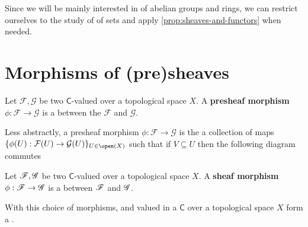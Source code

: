 \documentclass[../main.tex]{subfiles}
\begin{document}
Since we will be mainly interested in  of abelian groups and rings, we can restrict ourselves to the study of  of sets and apply \autoref{prop:sheaves-and-functors} when needed.



\section{Morphisms of (pre)sheaves}

\begin{definition} \label{def:presheaf-morphism}
  Let \(\mathcal{F}, \mathcal{G}\) be two \(\mathsf{C}\)-valued  over a topological space \(X\).
  A \textbf{presheaf morphism} \(\phi: \mathcal{F} \to \mathcal{G}\) is a  between the  \(\mathcal{F}\) and \(\mathcal{G}\).

  Less abstractly, a presheaf morphism \(\phi: \mathcal{F} \to \mathcal{G}\) is the a collection of maps \(\{\phi(U): \mathcal{F}(U) \to \mathcal{G}(U)\}_{U \in \open(X)}\) such that if \(V \subseteq U\) then the following diagram commutes
  \begin{center}
  \end{center}
\end{definition}


\begin{definition} \label{def:sheaf-morphism}
  Let \(\mathscr{F}, \mathscr{G}\) be two \(\mathsf{C}\)-valued  over a topological space \(X\).
  A \textbf{sheaf morphism} \(\phi: \mathscr{F} \to \mathscr{G}\) is a  between \(\mathscr{F}\) and \(\mathscr{G}\).
\end{definition}

With this choice of morphisms,  and  valued in a  \(\mathsf{C}\) over a topological space \(X\) form a .
\end{document}
